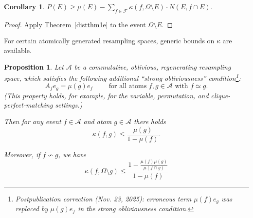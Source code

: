 \documentclass[11pt]{article}
\newcommand{\expref}[2]{\texorpdfstring{\hyperref[#2]{#1~\ref{#2}}}{#1~\ref{#2}}}
\newtheorem{corollary}[theorem]{Corollary}
\newtheorem{proposition}[theorem]{Proposition}
\newcommand\oa{\overline{\mathcal A}}
\begin{document}
\begin{corollary}
\label{distthm1f}
$P(E) \geq \mu(E) -  \sum_{f \in \mathcal F} \kappa(f, \Omega \setminus E) \cdot N(E, f \cap E )$.
\end{corollary}
\begin{proof}
Apply \expref{Theorem}{distthm1e} to the event $\Omega \setminus E$.
\end{proof}

For certain atomically generated resampling spaces, generic bounds on $\kappa$ are available.

\begin{proposition}
\label{kappabndgf2}
Let $\mathcal A$ be a commutative, oblivious, regenerating resampling space, which satisfies the following additional ``strong obliviousness''
condition\footnote{Postpublication correction (Nov. 23, 2025): erroneous term
$\mu(f) e_g$ was replaced by $\mu(g)e_f$ in the strong obliviousness condition.}:
$$
%
A_f e_g = \mu(g) e_f \qquad \text{ for all atoms $f,g \in \mathcal A$ with $f \simeq g$.}
$$
(This property  holds, for example, for the variable, permutation, and clique-perfect-matching settings.)

\medskip

Then for any  event $f \in \oa$ and atom $g \in \mathcal A$ there holds
$$
\kappa(f,g) \leq \frac{\mu(g)}{1 -  \mu(f)}.
$$

 Moreover, if $f \not \sim g$, we have
$$
\kappa(f,\Omega \setminus g) \leq \frac{1 - \frac{\mu(f) \mu(g)}{\mu(f \cap g)}}{1 -  \mu(f)}
$$ 
\end{proposition}
\end{document}
